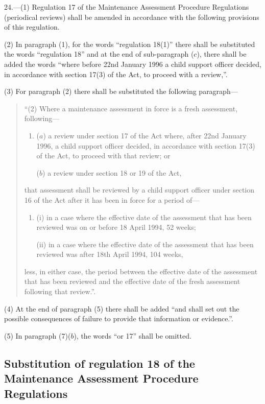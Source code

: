 \documentclass[a4paper]{article}
\begin{document}
24.—(1) Regulation 17 of the Maintenance Assessment Procedure Regulations (periodical reviews) shall be amended in accordance with the following provisions of this regulation.

(2) In paragraph (1), for the words “regulation 18(1)” there shall be substituted the words “regulation 18” and at the end of sub-paragraph ($c$), there shall be added the words “where before 22nd January 1996 a child support officer decided, in accordance with section 17(3) of the Act, to proceed with a review,”.

(3) For paragraph (2) there shall be substituted the following paragraph—
\begin{quotation}
“(2) Where a maintenance assessment in force is a fresh assessment, following—
\begin{enumerate}\item[]
($a$) a review under section 17 of the Act where, after 22nd January 1996, a child support officer decided, in accordance with section 17(3) of the Act, to proceed with that review; or

($b$) a review under section 18 or 19 of the Act,
\end{enumerate}
that assessment shall be reviewed by a child support officer under section 16 of the Act after it has been in force for a period of—
\begin{enumerate}\item[]
(i) in a case where the effective date of the assessment that has been reviewed was on or before 18 April 1994, 52 weeks;

(ii) in a case where the effective date of the assessment that has been reviewed was after 18th April 1994, 104 weeks,
\end{enumerate}
less, in either case, the period between the effective date of the assessment that has been reviewed and the effective date of the fresh assessment following that review.”.
\end{quotation}

(4) At the end of paragraph (5) there shall be added “and shall set out the possible consequences of failure to provide that information or evidence.”.

(5) In paragraph (7)($b$), the words “or 17” shall be omitted.

\subsection[25. Substitution of regulation 18 of the Maintenance Assessment Procedure Regulations]{Substitution of regulation 18 of the Maintenance Assessment Procedure Regulations}
\end{document}
